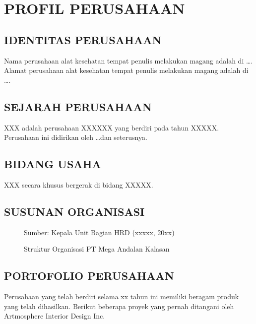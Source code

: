 \chapter{PROFIL PERUSAHAAN}
\label{chap:profilperusahaan}

\paragraphtextstyle

\section{IDENTITAS PERUSAHAAN}
\label{sec:identitasperusahaan}

Nama perusahaan alat kesehatan tempat penulis melakukan magang adalah di \ldots. Alamat perusahaan alat kesehatan tempat penulis melakukan magang adalah di \ldots.

\section{SEJARAH PERUSAHAAN}
\label{sec:sejarahperusahaan}

XXX adalah perusahaan XXXXXX yang berdiri pada tahun XXXXX. Perusahaan ini didirikan oleh \ldots dan seterusnya.

\section{BIDANG USAHA}
\label{sec:bidangusaha}

XXX secara khusus bergerak di bidang XXXXX.

\section{SUSUNAN ORGANISASI}
\label{sec:susunanorganisasi}

\begin{figure}[H]
  \centering
  \caption{Struktur Organisasi PT Mega Andalan Kalasan}
  \label{fig:strukturorganisasi}
  {\fontsize{10}{12}\selectfont Sumber: Kepala Unit Bagian HRD (xxxxx, 20xx)\par}
\end{figure}

\section{PORTOFOLIO PERUSAHAAN}
\label{sec:portofolioperusahaan}

Perusahaan yang telah berdiri selama xx tahun ini memiliki beragam produk yang telah dihasilkan. Berikut beberapa proyek yang pernah ditangani oleh Artmosphere Interior Design Inc.

